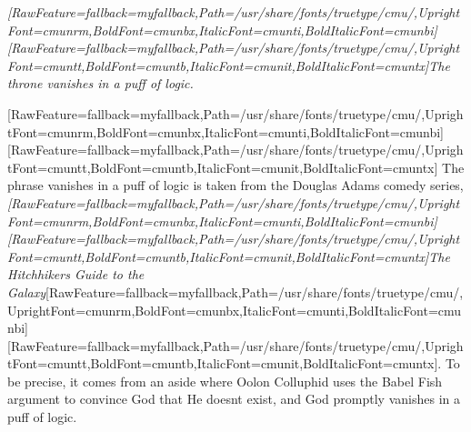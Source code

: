 \begin{myitemize}\item{}{\itshape \allowbreak{}\setmainfont{cmunti.ttf}[RawFeature={fallback=myfallback},Path=/usr/share/fonts/truetype/cmu/,UprightFont=cmunrm,BoldFont=cmunbx,ItalicFont=cmunti,BoldItalicFont=cmunbi]\setmonofont{cmunti.ttf}[RawFeature={fallback=myfallback},Path=/usr/share/fonts/truetype/cmu/,UprightFont=cmuntt,BoldFont=cmuntb,ItalicFont=cmunit,BoldItalicFont=cmuntx]\itshape {}The throne vanishes in a puff of logic.}
\end{myitemize}
\allowbreak{}\setmainfont{cmunrm.ttf}[RawFeature={fallback=myfallback},Path=/usr/share/fonts/truetype/cmu/,UprightFont=cmunrm,BoldFont=cmunbx,ItalicFont=cmunti,BoldItalicFont=cmunbi]\setmonofont{cmunrm.ttf}[RawFeature={fallback=myfallback},Path=/usr/share/fonts/truetype/cmu/,UprightFont=cmuntt,BoldFont=cmuntb,ItalicFont=cmunit,BoldItalicFont=cmuntx]
The phrase vanishes in a puff of logic is taken from the Douglas Adams\footnotemark[65] comedy series, {\itshape \allowbreak{}\setmainfont{cmunti.ttf}[RawFeature={fallback=myfallback},Path=/usr/share/fonts/truetype/cmu/,UprightFont=cmunrm,BoldFont=cmunbx,ItalicFont=cmunti,BoldItalicFont=cmunbi]\setmonofont{cmunti.ttf}[RawFeature={fallback=myfallback},Path=/usr/share/fonts/truetype/cmu/,UprightFont=cmuntt,BoldFont=cmuntb,ItalicFont=cmunit,BoldItalicFont=cmuntx]\itshape The Hitchhiker\textquotesingle{}s Guide to the Galaxy}\allowbreak{}\setmainfont{cmunrm.ttf}[RawFeature={fallback=myfallback},Path=/usr/share/fonts/truetype/cmu/,UprightFont=cmunrm,BoldFont=cmunbx,ItalicFont=cmunti,BoldItalicFont=cmunbi]\setmonofont{cmunrm.ttf}[RawFeature={fallback=myfallback},Path=/usr/share/fonts/truetype/cmu/,UprightFont=cmuntt,BoldFont=cmuntb,ItalicFont=cmunit,BoldItalicFont=cmuntx]. To be precise, it comes from an aside where Oolon Colluphid uses the Babel Fish argument to convince God that He doesn\textquotesingle{}t exist, and God promptly vanishes in a puff of logic.


